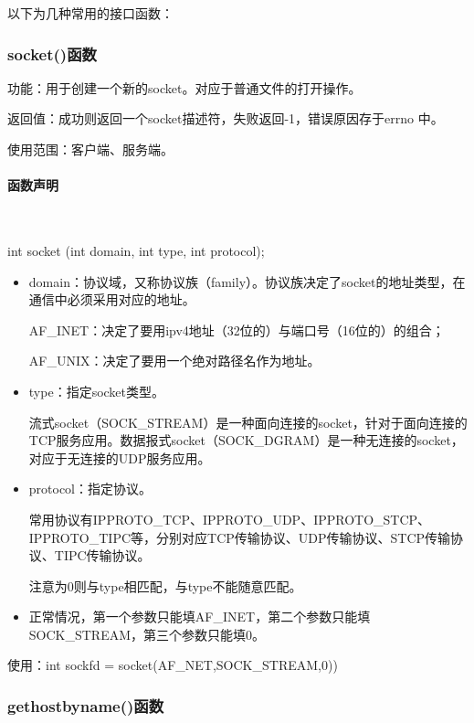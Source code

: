 \documentclass[UTF8]{article}%
\begin{document}
以下为几种常用的接口函数：

\subsubsection{socket()函数}

功能：用于创建一个新的socket。对应于普通文件的打开操作。

返回值：成功则返回一个socket描述符，失败返回-1，错误原因存于errno 中。

使用范围：客户端、服务端。

\paragraph{函数声明}~{}

int socket (int domain, int type, int protocol);

\begin{itemize}
    \item domain：协议域，又称协议族（family）。协议族决定了socket的地址类型，在通信中必须采用对应的地址。
    
        AF\_INET：决定了要用ipv4地址（32位的）与端口号（16位的）的组合；

        AF\_UNIX：决定了要用一个绝对路径名作为地址。

    \item type：指定socket类型。
    
        流式socket（SOCK\_STREAM）是一种面向连接的socket，针对于面向连接的TCP服务应用。数据报式socket（SOCK\_DGRAM）是一种无连接的socket，对应于无连接的UDP服务应用。

    \item protocol：指定协议。
    
        常用协议有IPPROTO\_TCP、IPPROTO\_UDP、IPPROTO\_STCP、IPPROTO\_TIPC等，分别对应TCP传输协议、UDP传输协议、STCP传输协议、TIPC传输协议。

        注意为0则与type相匹配，与type不能随意匹配。

    \item 正常情况，第一个参数只能填AF\_INET，第二个参数只能填SOCK\_STREAM，第三个参数只能填0。
\end{itemize}

使用：int sockfd = socket(AF\_NET,SOCK\_STREAM,0))

\subsubsection{gethostbyname()函数}
\end{document}
